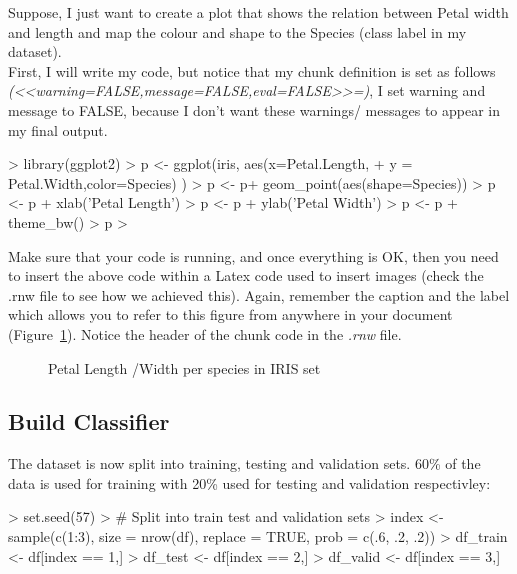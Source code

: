 \documentclass[10pt]{article}
\begin{document}
Suppose, I just want to create a plot that shows the relation between Petal width and length and map the colour and shape to the Species (class label in my dataset). \\

First, I will write my code, but notice that my chunk definition is set as follows\\ \textit{(<<warning=FALSE,message=FALSE,eval=FALSE>>=)}, I set warning and message to FALSE, because I don't want these warnings/ messages to appear in my final output. 


\begin{Schunk}
\begin{Sinput}
> library(ggplot2)
> p <- ggplot(iris, aes(x=Petal.Length, 
+                       y = Petal.Width,color=Species) )
> p <- p+ geom_point(aes(shape=Species))
> p <- p + xlab('Petal Length')
> p <- p + ylab('Petal Width')
> p <- p + theme_bw()
> p
> 
\end{Sinput}
\end{Schunk}

Make sure that your code is running, and once everything is OK, then you need to insert the above code within a Latex code used to insert images (check the .rnw file to see how we achieved this). Again, remember the caption and the label which allows you to refer to this figure from anywhere in your document (Figure~\ref{fig1}). Notice the header of the chunk code in the \textit{.rnw} file. 

\begin{figure}[H]
\begin{center}

\caption {Petal Length /Width per species in IRIS set}
\label{fig1}
\end {center}
\end {figure}

\subsection{Build Classifier}
The dataset is now split into training, testing and validation sets. 60\% of the data is used for training with 20\% used for testing and validation respectivley:
\begin{Schunk}
\begin{Sinput}
> set.seed(57)
> # Split into train test and validation sets
> index <- sample(c(1:3), size = nrow(df), replace = TRUE, prob = c(.6, .2, .2))
> df_train <- df[index == 1,]
> df_test <- df[index == 2,]
> df_valid <- df[index == 3,]
\end{Sinput}
\end{Schunk}
\end{document}
